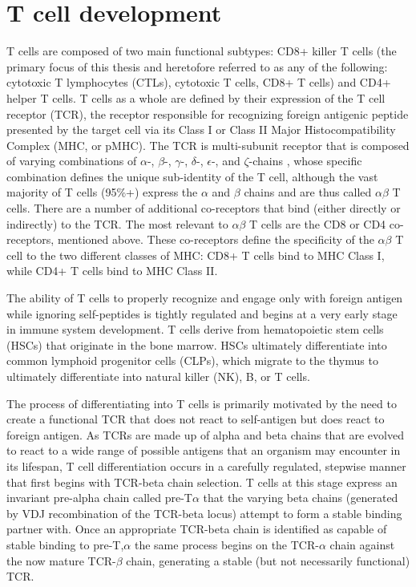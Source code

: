 \section{T cell development}
T cells are composed of two main functional subtypes: CD8+ killer T cells (the primary focus of this thesis and heretofore referred to as any of the following: cytotoxic T lymphocytes (CTLs), cytotoxic T cells, CD8+ T cells) and CD4+ helper T cells. T cells as a whole are defined by their expression of the T cell receptor (TCR), the receptor responsible for recognizing foreign antigenic peptide presented by the target cell via its Class I or Class II Major Histocompatibility Complex (MHC, or pMHC). The TCR is multi-subunit receptor that is composed of varying combinations of $\alpha$-, $\beta$-, $\gamma$-, $\delta$-, $\epsilon$-, and $\zeta$-chains \cite{Germain2002}, whose specific combination defines the unique sub-identity of the T cell, although the vast majority of T cells (95\%+) express the $\alpha$ and $\beta$ chains and are thus called $\alpha \beta$ T cells. There are a number of additional co-receptors that bind (either directly or indirectly) to the TCR. The most relevant to $\alpha \beta$ T cells are the CD8 or CD4 co-receptors, mentioned above. These co-receptors define the specificity of the $\alpha \beta$ T cell to the two different classes of MHC: CD8+ T cells bind to MHC Class I, while CD4+ T cells bind to MHC Class II. 

The ability of T cells to properly recognize and engage only with foreign antigen while ignoring self-peptides is tightly regulated and begins at a very early stage in immune system development. T cells derive from hematopoietic stem cells (HSCs) that originate in the bone marrow. HSCs ultimately differentiate into common lymphoid progenitor cells (CLPs), which migrate to the thymus to ultimately differentiate into natural killer (NK), B, or T cells. 

The process of differentiating into T cells is primarily motivated by the need to create a functional TCR that does not react to self-antigen but does react to foreign antigen. As TCRs are made up of alpha and beta chains that are evolved to react to a wide range of possible antigens that an organism may encounter in its lifespan, T cell differentiation occurs in a carefully regulated, stepwise manner that first begins with TCR-beta chain selection. T cells at this stage express an invariant pre-alpha chain called pre-T$\alpha$ that the varying beta chains (generated by VDJ recombination of the TCR-beta locus) attempt to form a stable binding partner with. Once an appropriate TCR-beta chain is identified as capable of stable binding to pre-T,$\alpha$ the same process begins on the TCR-$\alpha$ chain against the now mature TCR-$\beta$ chain, generating a stable (but not necessarily functional) TCR.

